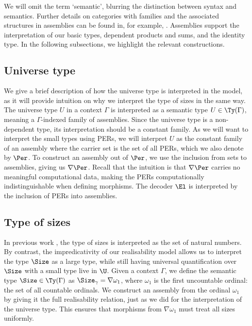 We will omit the term `semantic', blurring the distinction between syntax and semantics. Further details on categories with families and the associated structures in assemblies can be found in, for example, \cite{Hofmann_1997, REUS1999128}. Assemblies support the interpretation of our basic types, dependent products and sums, and the identity type. In the following subsections, we highlight the relevant constructions.


\subsection{Universe type}
We give a brief description of how the universe type is interpreted in the model, as it will provide intuition on why we interpret the type of sizes in the same way.
The universe type \( U \) in a context \( \Gamma \) is interpreted as a semantic type \( U \in \Ty(\Gamma) \), meaning a \( \Gamma \)-indexed family of assemblies. Since the universe type is a non-dependent type, its interpretation should be a constant family. As we will want to interpret the small types using PERs, we will interpret \( U \) as the constant family of an assembly where the carrier set is the set of all PERs, which we also denote by \( \Per \). To construct an assembly out of \( \Per \), we use the inclusion from sets to assemblies, giving us \( \nabla \Per \). Recall that the intuition is that \( \nabla \Per \) carries no meaningful computational data, making the PERs computationally indistinguishable when defining morphisms.
The decoder \( \El \) is interpreted by the inclusion of PERs into assemblies.

\subsection{Type of sizes}
In previous work \cite{parametric-quantifier}, the type of sizes is interpreted as the set of natural numbers. By contrast, the impredicativity of our realisability model allows us to interpret the type $\Size$ as a large type, while still having universal quantification over $\Size$ with a small type live in $\U$. Given a context $\Gamma$, we define the semantic type $\Size \in \Ty(\Gamma)$ as $\Size_\gamma = \nabla \omega_1$, where $\omega_1$ is the first uncountable ordinal: the set of all countable ordinals.
We construct an assembly from the ordinal \( \omega_1 \) by giving it the full realisability relation, just as we did for the interpretation of the universe type. This ensures that morphisms from \( \nabla \omega_1 \) must treat all sizes uniformly.

